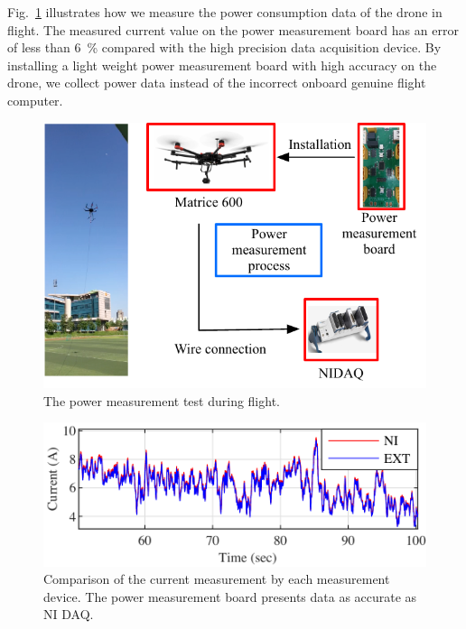 \documentclass[journal]{./template/IEEEtran}
\begin{document}
Fig.~\ref{fig:flight_test} illustrates how we measure the power consumption data of the drone in flight.
The measured current value on the power measurement board has an error of less than 6~\% compared with the high precision data acquisition device. By installing a light weight power measurement board with high accuracy on the drone, we collect power data instead of the incorrect onboard genuine flight computer.

\begin{figure}[ht]
\centering
\includegraphics[scale=0.80]{fig3/flight_experiment.pdf}
\caption{The power measurement test during flight.}
\label{fig:flight_test}
\end{figure}

\begin{figure}[ht]
\centering
\includegraphics[scale=1.0]{fig4/flight_exp_result.pdf}
\caption{Comparison of the current measurement by each measurement device. The power measurement board presents data as accurate as NI DAQ.}
\end{figure}
\label{Section: Design the power measurement board}
\end{document}

